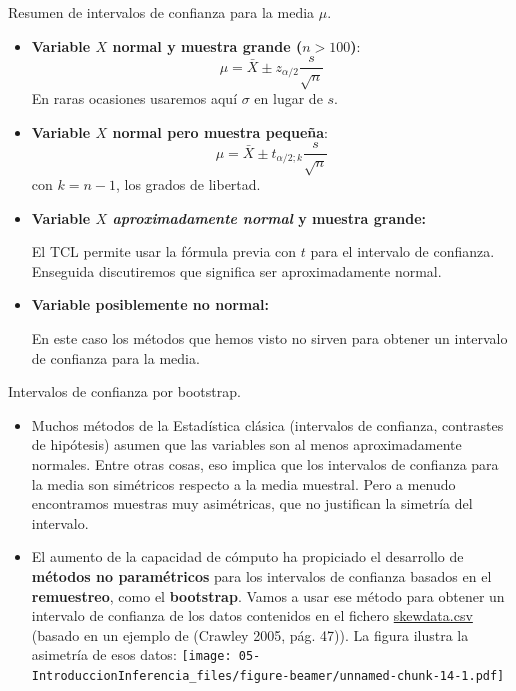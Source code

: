 \documentclass[
  9pt,
  ignorenonframetext,
]{beamer}
\newcommand{\link}[2]{\textcolor{blue}{{\href{#1}{#2}}}}
\begin{document}
\begin{frame}{Resumen de intervalos de confianza para la media \(\mu\).}
\protect\hypertarget{resumen-de-intervalos-de-confianza-para-la-media-mu.}{}

\begin{itemize}
\item
  \textbf{Variable \(X\) normal y muestra grande (\(n > 100\))}:\\
  \[\mu = \bar X \pm z_{\alpha/2} \dfrac{s}{\sqrt{n}}\] En raras
  ocasiones usaremos aquí \(\sigma\) en lugar de \(s\).
\item
  \textbf{Variable \(X\) normal pero muestra pequeña}:\\
  \[\mu = \bar X \pm t_{\alpha/2;k} \dfrac{s}{\sqrt{n}}\] con
  \(k = n - 1\), los grados de libertad.
\item
  \textbf{Variable \(X\) \emph{aproximadamente normal} y muestra
  grande:}

  El TCL permite usar la fórmula previa con \(t\) para el intervalo de
  confianza.\\
  Enseguida discutiremos que significa ser aproximadamente normal.
\item
  \textbf{Variable posiblemente no normal:}

  En este caso los métodos que hemos visto no sirven para obtener un
  intervalo de confianza para la media.
\end{itemize}

\end{frame}

\begin{frame}{Intervalos de confianza por bootstrap.}
\protect\hypertarget{intervalos-de-confianza-por-bootstrap.}{}

\begin{itemize}
\item
  Muchos métodos de la Estadística clásica (intervalos de confianza,
  contrastes de hipótesis) asumen que las variables son al menos
  aproximadamente normales. Entre otras cosas, eso implica que los
  intervalos de confianza para la media son simétricos respecto a la
  media muestral. Pero a menudo encontramos muestras muy asimétricas,
  que no justifican la simetría del intervalo.
\item
  El aumento de la capacidad de cómputo ha propiciado el desarrollo de
  \textbf{métodos no paramétricos} para los intervalos de confianza
  basados en el \textbf{remuestreo}, como el \textbf{bootstrap}. Vamos a
  usar ese método para obtener un intervalo de confianza de los datos
  contenidos en el fichero
  \link{http://www.postdata-statistics.com/docs/skewdata.csv}{skewdata.csv}
  (basado en un ejemplo de (Crawley 2005, pág. 47)). La figura ilustra
  la asimetría de esos datos:
  \texttt{[image: 05-IntroduccionInferencia\_files/figure-beamer/unnamed-chunk-14-1.pdf]}
\end{itemize}

\end{frame}
\end{document}
